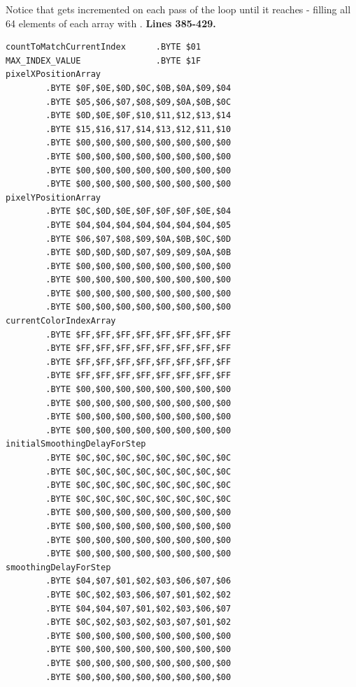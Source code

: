 Notice that  gets incremented on each pass of the loop until it reaches  - filling all 64 elements of each array with
.
\clearpage
\textbf{Lines 385-429. }
\begin{lstlisting}[caption = The pixel buffers\, each 64 bytes long though only 32 bytes are used in this version thanks to \icode{MAX\_INDEX\_VALUE}
being set to \icode{\$1F} (32).]
countToMatchCurrentIndex      .BYTE $01
MAX_INDEX_VALUE               .BYTE $1F
pixelXPositionArray   
        .BYTE $0F,$0E,$0D,$0C,$0B,$0A,$09,$04
        .BYTE $05,$06,$07,$08,$09,$0A,$0B,$0C
        .BYTE $0D,$0E,$0F,$10,$11,$12,$13,$14
        .BYTE $15,$16,$17,$14,$13,$12,$11,$10
        .BYTE $00,$00,$00,$00,$00,$00,$00,$00
        .BYTE $00,$00,$00,$00,$00,$00,$00,$00
        .BYTE $00,$00,$00,$00,$00,$00,$00,$00
        .BYTE $00,$00,$00,$00,$00,$00,$00,$00
pixelYPositionArray   
        .BYTE $0C,$0D,$0E,$0F,$0F,$0F,$0E,$04
        .BYTE $04,$04,$04,$04,$04,$04,$04,$05
        .BYTE $06,$07,$08,$09,$0A,$0B,$0C,$0D
        .BYTE $0D,$0D,$0D,$07,$09,$09,$0A,$0B
        .BYTE $00,$00,$00,$00,$00,$00,$00,$00
        .BYTE $00,$00,$00,$00,$00,$00,$00,$00
        .BYTE $00,$00,$00,$00,$00,$00,$00,$00
        .BYTE $00,$00,$00,$00,$00,$00,$00,$00
currentColorIndexArray   
        .BYTE $FF,$FF,$FF,$FF,$FF,$FF,$FF,$FF
        .BYTE $FF,$FF,$FF,$FF,$FF,$FF,$FF,$FF
        .BYTE $FF,$FF,$FF,$FF,$FF,$FF,$FF,$FF
        .BYTE $FF,$FF,$FF,$FF,$FF,$FF,$FF,$FF
        .BYTE $00,$00,$00,$00,$00,$00,$00,$00
        .BYTE $00,$00,$00,$00,$00,$00,$00,$00
        .BYTE $00,$00,$00,$00,$00,$00,$00,$00
        .BYTE $00,$00,$00,$00,$00,$00,$00,$00
initialSmoothingDelayForStep   
        .BYTE $0C,$0C,$0C,$0C,$0C,$0C,$0C,$0C
        .BYTE $0C,$0C,$0C,$0C,$0C,$0C,$0C,$0C
        .BYTE $0C,$0C,$0C,$0C,$0C,$0C,$0C,$0C
        .BYTE $0C,$0C,$0C,$0C,$0C,$0C,$0C,$0C
        .BYTE $00,$00,$00,$00,$00,$00,$00,$00
        .BYTE $00,$00,$00,$00,$00,$00,$00,$00
        .BYTE $00,$00,$00,$00,$00,$00,$00,$00
        .BYTE $00,$00,$00,$00,$00,$00,$00,$00
smoothingDelayForStep   
        .BYTE $04,$07,$01,$02,$03,$06,$07,$06
        .BYTE $0C,$02,$03,$06,$07,$01,$02,$02
        .BYTE $04,$04,$07,$01,$02,$03,$06,$07
        .BYTE $0C,$02,$03,$02,$03,$07,$01,$02
        .BYTE $00,$00,$00,$00,$00,$00,$00,$00
        .BYTE $00,$00,$00,$00,$00,$00,$00,$00
        .BYTE $00,$00,$00,$00,$00,$00,$00,$00
        .BYTE $00,$00,$00,$00,$00,$00,$00,$00


\end{lstlisting}
\clearpage

